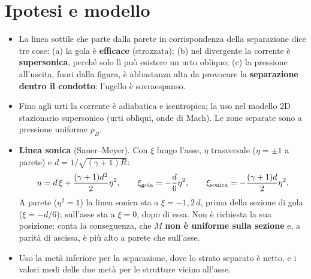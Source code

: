 \documentclass[11pt,a4paper]{article}
\begin{document}
\section{Ipotesi e modello}
\begin{itemize}
\item La linea sottile che parte dalla parete in corrispondenza della separazione dice tre cose: (a) la gola è
  \textbf{efficace} (strozzata); (b) nel divergente la corrente è \textbf{supersonica}, perché solo lì può esistere un
  urto obliquo; (c) la pressione all'uscita, fuori dalla figura, è abbastanza alta da provocare la
  \textbf{separazione dentro il condotto}: l'ugello è sovraespanso.
\item Fino agli urti la corrente è adiabatica e isentropica; la uso nel modello 2D stazionario supersonico (urti
  obliqui, onde di Mach). Le zone separate sono a pressione uniforme $p_B$.
\item \textbf{Linea sonica} (Sauer--Meyer). Con $\xi$ lungo l'asse, $\eta$ trasversale ($\eta=\pm1$ a parete) e
  $d=1/\sqrt{(\gamma+1)R}$:
  \[
  u=d\,\xi+\frac{(\gamma+1)d^2}{2}\eta^2,\qquad
  \xi_{\rm gola}=-\frac d6\eta^2,\qquad
  \xi_{\rm sonica}=-\frac{(\gamma+1)d}{2}\eta^2 .
  \]
  A parete ($\eta^2=1$) la linea sonica sta a $\xi=-1{,}2\,d$, prima della sezione di gola ($\xi=-d/6$); sull'asse
  sta a $\xi=0$, dopo di essa. Non è richiesta la sua posizione: conta la conseguenza, che $M$ \textbf{non è uniforme
  sulla sezione} e, a parità di ascissa, è più alto a parete che sull'asse.
\item Uso la metà inferiore per la separazione, dove lo strato separato è netto, e i valori medi delle due metà per le
  strutture vicino all'asse.
\end{itemize}

\end{document}
